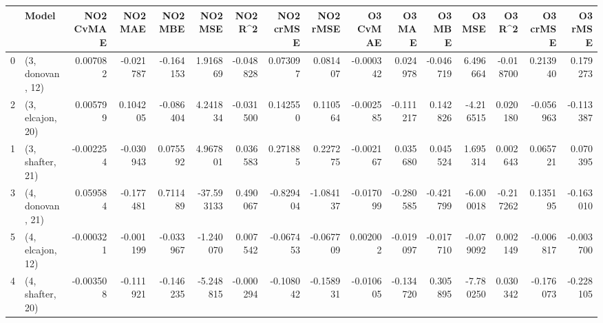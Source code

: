 \begin{tabular}{llrrrrrrrrrrrrrr}
\toprule
{} &             Model &  NO2 CvMAE &   NO2 MAE &   NO2 MBE &    NO2 MSE &   NO2 R\textasciicircum2 &  NO2 crMSE &  NO2 rMSE &  O3 CvMAE &    O3 MAE &    O3 MBE &    O3 MSE &    O3 R\textasciicircum2 &  O3 crMSE &   O3 rMSE \\
\midrule
0 &  (3, donovan, 12) &   0.007082 & -0.021787 & -0.164153 &   1.916869 & -0.048828 &   0.073097 &  0.081407 & -0.000342 &  0.024978 & -0.046719 &  6.496664 & -0.018700 &  0.213940 &  0.179273 \\
2 &  (3, elcajon, 20) &   0.005799 &  0.104205 & -0.086404 &   4.241834 & -0.031500 &   0.142550 &  0.110564 & -0.002585 & -0.111217 &  0.142826 & -4.216515 &  0.020180 & -0.056963 & -0.113387 \\
1 &  (3, shafter, 21) &  -0.002254 & -0.030943 &  0.075592 &   4.967801 &  0.036583 &   0.271885 &  0.227275 & -0.002167 &  0.035680 &  0.045524 &  1.695314 &  0.002643 &  0.065721 &  0.070395 \\
3 &  (4, donovan, 21) &   0.059584 & -0.177481 &  0.711489 & -37.593133 &  0.490067 &  -0.829404 & -1.084137 & -0.017099 & -0.280585 & -0.421799 & -6.000018 & -0.217262 &  0.135195 & -0.163010 \\
5 &  (4, elcajon, 12) &  -0.000321 & -0.001199 & -0.033967 &  -1.240070 &  0.007542 &  -0.067453 & -0.067709 &  0.002002 & -0.019097 & -0.017710 & -0.079092 &  0.002149 & -0.006817 & -0.003700 \\
4 &  (4, shafter, 20) &  -0.003508 & -0.111921 & -0.146235 &  -5.248815 & -0.000294 &  -0.108042 & -0.158931 & -0.010605 & -0.134720 &  0.305895 & -7.780250 &  0.030342 & -0.176073 & -0.228105 \\
\bottomrule
\end{tabular}
